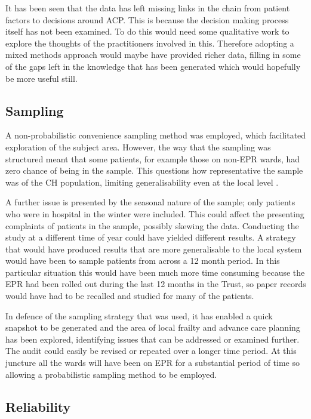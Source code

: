\documentclass
[
	12pt,
	a4paper,
	oneside,
]{report}
\begin{document}
It has been seen that the data has left missing links in the 
chain from patient factors to decisions around ACP. This is because the
decision making process itself has not been examined. To do this would need 
some qualitative work to explore the thoughts of the practitioners involved
in this. Therefore adopting a mixed methods approach 
would maybe have provided richer data, filling in some of the gaps left in the
knowledge that has been generated which would hopefully be more useful still.

\subsection{Sampling}
A non-probabilistic convenience sampling method was employed, which facilitated 
exploration of the subject area. However, the way that the sampling was 
structured meant that some patients, for example those on non-EPR wards, had
zero chance of being in the sample. This questions how representative the sample
was of the CH population, limiting generalisability even at the local level 
\parencite{biggam:15}.

A further issue is presented by the seasonal 
nature of the sample; only patients who were in hospital in the winter were 
included. This could affect the presenting complaints of patients in the sample,
possibly skewing the data.
Conducting the study at a different time of year could have yielded different 
results. A strategy that would have produced results that are more generalisable
to the local system would have been to sample patients from across
a 12 month period. In this particular situation this would have been much more
time consuming because the EPR had been rolled out during the last 12 months in
the Trust, so paper records would have had to be recalled and studied for many
of the patients. 

In defence of the sampling strategy that was used, it has enabled a quick 
snapshot to be generated and the area of local frailty and advance care planning
has been explored, identifying issues that can be
addressed or examined further. The audit could easily be revised or repeated 
over a longer time period. At this juncture all the wards 
will have been on EPR for a substantial period of time so
allowing a probabilistic sampling method to be employed.

\subsection{Reliability} 
\end{document}
